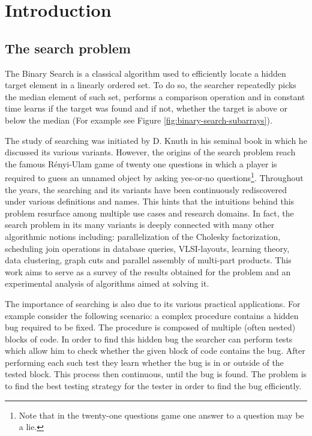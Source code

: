 \chapter{Introduction}
\section{The search problem}
The Binary Search is a classical algorithm used to efficiently locate a hidden target element in a linearly ordered set. To do so, the searcher repeatedly picks the median element of such set, performs a comparison operation and in constant time learns if the target was found and if not, whether the target is above or below the median (For example see Figure \ref{fig:binary-search-subarrays}).



The study of searching was initiated by D. Knuth in his seminal book \cite{Knuth1973} in which he discussed its various variants. However, the origins of the search problem reach the famous Rényi-Ulam game of twenty one questions in which a player is required to guess an unnamed object by asking yes-or-no questions\footnote{Note that in the twenty-one questions game one answer to a question may be a lie.}. Throughout the years, the searching and its variants have been continuously rediscovered under various definitions and names. This hints that the intuitions behind this problem resurface among multiple use cases and research domains. In fact, the search problem in its many variants is deeply connected with many other algorithmic notions including: parallelization of the Cholesky factorization, scheduling join operations in database queries, VLSI-layouts, learning theory, data clustering, graph cuts and parallel assembly of multi-part products. This work aims to serve as a survey of the results obtained for the problem and an experimental analysis of algorithms aimed at solving it.

The importance of searching is also due to its various practical applications. For example consider the following scenario: a complex procedure contains a hidden bug required to be fixed. The procedure is composed of multiple (often nested) blocks of code. In order to find this hidden bug the searcher can perform tests which allow him to check whether the given block of code contains the bug. After performing each such test they learn whether the bug is in or outside of the tested block. This process then continuous, until the bug is found. The problem is to find the best testing strategy for the tester in order to find the bug efficiently.

